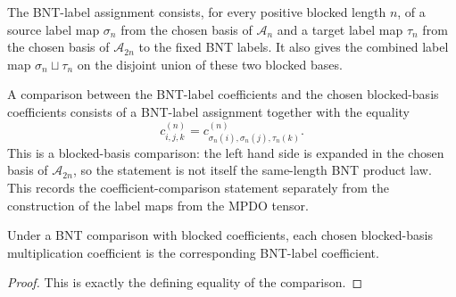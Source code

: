 \begin{definition}%
    \label{def:mpdo_bnt_blocked_basis_label_assignment}
    \leanok
    The BNT-label assignment consists, for every positive blocked length $n$,
    of a source label map $\sigma_n$ from the chosen basis of
    $\mathcal A_n$ and a target label map $\tau_n$ from the chosen basis of
    $\mathcal A_{2n}$ to the fixed BNT labels. It also gives the combined
    label map $\sigma_n \sqcup \tau_n$ on the disjoint union of these two
    blocked bases.
\end{definition}

\begin{definition}%
    \label{def:mpdo_bnt_blocked_basis_coefficient_comparison}
    \leanok
    A comparison between the BNT-label coefficients and the chosen
    blocked-basis coefficients consists of a BNT-label assignment together
    with the equality
    \[
        c^{(n)}_{i,j,k}
        =
        c^{(n)}_{\sigma_n(i),\sigma_n(j),\tau_n(k)}.
    \]
    This is a blocked-basis comparison: the left hand side is expanded in the
    chosen basis of $\mathcal A_{2n}$, so the statement is not itself the
    same-length BNT product law.
    This records the coefficient-comparison statement separately from the
    construction of the label maps from the MPDO tensor.
\end{definition}

\begin{theorem}%
    \label{thm:mpdo_bnt_blocked_basis_coefficient_eq}
    \leanok
    Under a BNT comparison with blocked coefficients, each chosen blocked-basis
    multiplication coefficient is the corresponding BNT-label coefficient.
\end{theorem}
\begin{proof}\leanok
    This is exactly the defining equality of the comparison.
\end{proof}

